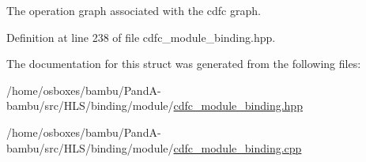 The operation graph associated with the cdfc graph. 



Definition at line 238 of file cdfc\+\_\+module\+\_\+binding.\+hpp.



The documentation for this struct was generated from the following files\+:\begin{DoxyCompactItemize}
\item 
/home/osboxes/bambu/\+Pand\+A-\/bambu/src/\+H\+L\+S/binding/module/\hyperlink{cdfc__module__binding_8hpp}{cdfc\+\_\+module\+\_\+binding.\+hpp}\item 
/home/osboxes/bambu/\+Pand\+A-\/bambu/src/\+H\+L\+S/binding/module/\hyperlink{cdfc__module__binding_8cpp}{cdfc\+\_\+module\+\_\+binding.\+cpp}\end{DoxyCompactItemize}
